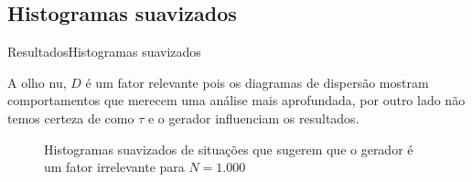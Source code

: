 \documentclass[10pt,xcolor={dvipsnames}]{beamer}
\begin{document}
\subsection{Histogramas suavizados}
\begin{frame}{Resultados}{Histogramas suavizados}
\begin{block}{}
	A olho nu, $D$ é um fator relevante pois os diagramas de dispersão mostram comportamentos que merecem uma análise mais aprofundada, por outro lado não temos certeza de como $\tau$ e o gerador influenciam os resultados. 
\pause
	\begin{figure} %
		\centering
		\caption{Histogramas suavizados de situações que sugerem que o gerador é um fator irrelevante para $N=1.000$}\label{fig:GeradorIrrelevante1k}
	\end{figure}
\end{block}
\end{frame}
\end{document}
